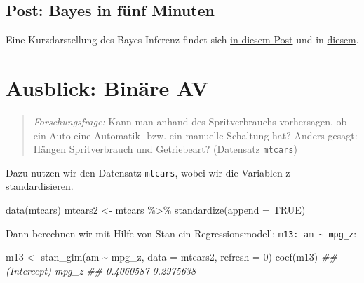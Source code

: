 \documentclass[
  a4paper,
  DIV=11]{scrreprt}
\newenvironment{Shaded}{\begin{snugshade}}{\end{snugshade}}
\newcommand{\AttributeTok}[1]{\textcolor[rgb]{0.40,0.45,0.13}{#1}}
\newcommand{\ConstantTok}[1]{\textcolor[rgb]{0.56,0.35,0.01}{#1}}
\newcommand{\DecValTok}[1]{\textcolor[rgb]{0.68,0.00,0.00}{#1}}
\newcommand{\DocumentationTok}[1]{\textcolor[rgb]{0.37,0.37,0.37}{\textit{#1}}}
\newcommand{\FunctionTok}[1]{\textcolor[rgb]{0.28,0.35,0.67}{#1}}
\newcommand{\NormalTok}[1]{\textcolor[rgb]{0.00,0.23,0.31}{#1}}
\newcommand{\OtherTok}[1]{\textcolor[rgb]{0.00,0.23,0.31}{#1}}
\newcommand{\SpecialCharTok}[1]{\textcolor[rgb]{0.37,0.37,0.37}{#1}}
\theoremstyle{definition}
\theoremstyle{remark}
\begin{document}
\hypertarget{post-bayes-in-fuxfcnf-minuten}{%
\subsection{Post: Bayes in fünf
Minuten}\label{post-bayes-in-fuxfcnf-minuten}}

Eine Kurzdarstellung des Bayes-Inferenz findet sich
\href{https://data-se.netlify.app/2022/01/27/bayes-in-f\%C3\%BCnf-minuten/}{in
diesem Post} und in
\href{https://data-se.netlify.app/2022/01/28/bayes-in-f\%C3\%BCnf-minuten-f\%C3\%BCr-fortgeschrittene/}{diesem}.

\hypertarget{ausblick-binuxe4re-av}{%
\section{Ausblick: Binäre AV}\label{ausblick-binuxe4re-av}}

\begin{quote}
\emph{Forschungsfrage:} Kann man anhand des Spritverbrauchs vorhersagen,
ob ein Auto eine Automatik- bzw. ein manuelle Schaltung hat? Anders
gesagt: Hängen Spritverbrauch und Getriebeart? (Datensatz
\texttt{mtcars})
\end{quote}

Dazu nutzen wir den Datensatz \texttt{mtcars}, wobei wir die Variablen
z-standardisieren.

\begin{Shaded}
\begin{Highlighting}[]
\FunctionTok{data}\NormalTok{(mtcars)}
\NormalTok{mtcars2 }\OtherTok{\textless{}{-}}
\NormalTok{  mtcars }\SpecialCharTok{\%\textgreater{}\%} 
  \FunctionTok{standardize}\NormalTok{(}\AttributeTok{append =} \ConstantTok{TRUE}\NormalTok{)}
\end{Highlighting}
\end{Shaded}

Dann berechnen wir mit Hilfe von Stan ein Regressionsmodell:
\texttt{m13:\ am\ \textasciitilde{}\ mpg\_z}:

\begin{Shaded}
\begin{Highlighting}[]
\NormalTok{m13 }\OtherTok{\textless{}{-}}
  \FunctionTok{stan\_glm}\NormalTok{(am }\SpecialCharTok{\textasciitilde{}}\NormalTok{ mpg\_z, }
           \AttributeTok{data =}\NormalTok{ mtcars2, }
           \AttributeTok{refresh =} \DecValTok{0}\NormalTok{)}
\FunctionTok{coef}\NormalTok{(m13)}
\DocumentationTok{\#\# (Intercept)       mpg\_z }
\DocumentationTok{\#\#   0.4060587   0.2975638}
\end{Highlighting}
\end{Shaded}
\end{document}
